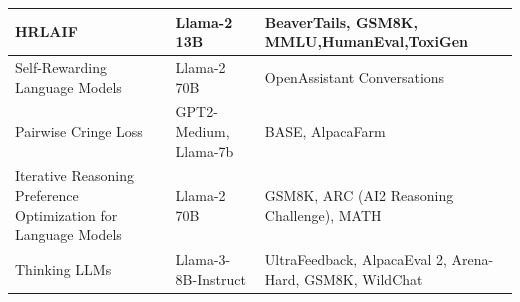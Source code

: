 \begin{table}[t]
\begin{tabular}{|p{4cm}|p{4cm}|p{8cm}|}
        \hline
        HRLAIF \autocite{li2024hrlaifimprovementshelpfulnessharmlessness}                                                           & Llama-2 13B                                                                                                            & BeaverTails, GSM8K, MMLU,HumanEval,ToxiGen                                                                                                                                                                                   \\
        \hline
        Self-Rewarding Language Models \autocite{yuan2024selfrewardinglanguagemodels}                                               & Llama-2 70B                                                                                                            & OpenAssistant Conversations                                                                                                                                                                                                  \\
        \hline
        Pairwise Cringe Loss \autocite{xu2024thingscringeothersiterative}                                                           & GPT2-Medium, Llama-7b                                                                                                  & BASE, AlpacaFarm                                                                                                                                                                                                             \\
        \hline
        Iterative Reasoning Preference Optimization for Language Models \autocite{pang2024iterativereasoningpreferenceoptimization} & Llama-2 70B                                                                                                            & GSM8K, ARC (AI2 Reasoning Challenge), MATH                                                                                                                                                                                   \\
        \hline
        Thinking LLMs \autocite{wu2024thinkingllmsgeneralinstruction}                                                               & Llama-3-8B-Instruct                                                                                                    & UltraFeedback, AlpacaEval 2, Arena-Hard, GSM8K, WildChat                                                                                                                                                                     \\

\end{tabular}
\end{table}
